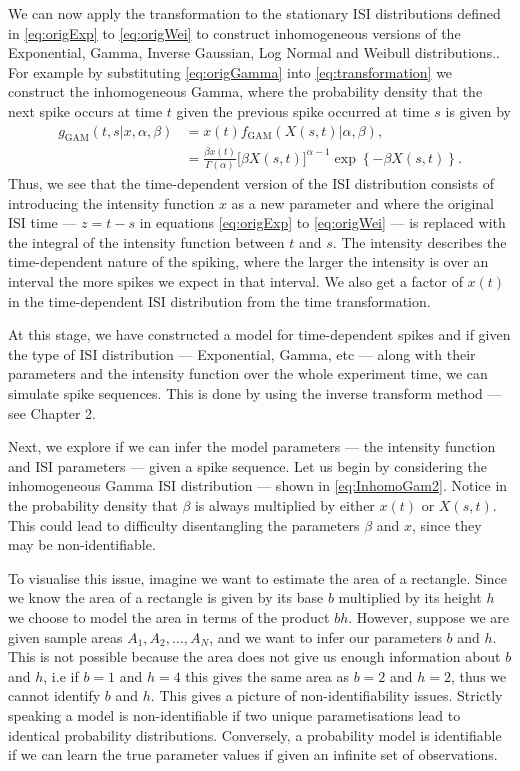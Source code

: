 \documentclass[oneside, 12 pt]{book}
\begin{document}
We can now apply the transformation to the stationary ISI distributions defined in \eqref{eq:origExp} to \eqref{eq:origWei} to construct inhomogeneous versions of the Exponential, Gamma, Inverse Gaussian, Log Normal and Weibull distributions.. 
For example by substituting \eqref{eq:origGamma} into \eqref{eq:transformation} we construct the inhomogeneous Gamma, where the probability density that the next spike occurs at time $t$ given the previous spike occurred at time $s$ is given by
\begin{align}\label{eq:InhomoGam2}
	g_{\mathrm{GAM}}(t,s | x, \alpha, \beta) &= x(t) f_{\mathrm{GAM}}(X(s,t)|\alpha,\beta), \nonumber \\
	  &=   \frac{\beta x(t)}{\Gamma ( \alpha )} \big[ \beta X(s,t) \big]^{\alpha -1} \exp \left\{ - \beta X(s,t)  \right\}. 
\end{align} 
Thus, we see that the time-dependent version of the ISI distribution consists of introducing the intensity function $x$ as a new parameter and where the original ISI time --- $z = t-s$ in equations \eqref{eq:origExp} to \eqref{eq:origWei} --- is replaced with the integral of the intensity function between $t$ and $s$. The intensity describes the time-dependent nature of the  spiking, where the larger the intensity is over an interval the more spikes we expect in that interval.  We also get a factor of $x(t)$ in the time-dependent ISI distribution from the time transformation. 


At this stage, we have constructed a model for time-dependent  spikes and if given the type of ISI distribution --- Exponential, Gamma, etc --- along with their parameters and the intensity function over the whole experiment time, we can simulate spike sequences. This is done by using the inverse transform method --- see Chapter 2. 

Next, we explore if we can infer the model parameters --- the intensity function and ISI parameters --- given a spike sequence.  Let us begin by considering the inhomogeneous Gamma ISI distribution --- shown in \eqref{eq:InhomoGam2}. Notice in the probability density that $\beta$ is always multiplied by either $x(t)$ or $X(s,t)$. This could lead to difficulty disentangling the parameters $\beta$ and $x$, since they may be non-identifiable.

To visualise this issue, imagine we want to estimate the area of a rectangle. Since we know the area of a rectangle is given by its base $b$ multiplied by its height $h$ we choose to model the area in terms of the product $bh$. However, suppose we are given sample areas $A_1, A_2, \dots, A_N$, and we want to infer our parameters $b$ and $h$. This is not possible because the area does not give us enough information about $b$ and $h$, i.e if $b=1$ and $h=4$ this gives the same area as $b=2$ and $h=2$, thus we cannot identify $b$ and $h$. This gives a picture of non-identifiability issues. Strictly speaking a model is non-identifiable if two unique parametisations lead to identical probability distributions. Conversely, a probability model is identifiable if we can learn the true parameter values if given an infinite set of observations.
\end{document}

